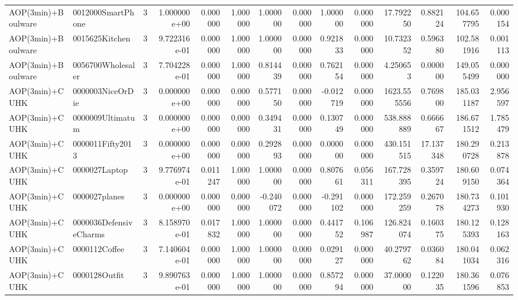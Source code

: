 \begin{tabular}{llrr|r|rr|rr|rr|rrr}
       AOP(3min)+Boulware &      0012000SmartPhone &       3 & 1.000000e+00 & 0.000000 & 1.000000 &      1.000000 & 0.000000 &      1.000000 & 0.000000 &     17.792250 &    0.882124 &   104.657795 &    0.000154 \\
       AOP(3min)+Boulware &         0015625Kitchen &       3 & 9.722316e-01 & 0.000000 & 1.000000 &      1.000000 & 0.000000 &      0.921833 & 0.000000 &     10.732352 &    0.596380 &   102.581916 &    0.001113 \\
       AOP(3min)+Boulware &      0056700Wholesaler &       3 & 7.704228e-01 & 0.000000 & 1.000000 &      0.814439 & 0.000000 &      0.762154 & 0.000000 &      4.250653 &    0.000000 &   149.055499 &    0.000000 \\
           AOP(3min)+CUHK &       0000003NiceOrDie &       3 & 0.000000e+00 & 0.000000 & 0.000000 &      0.577150 & 0.000000 &     -0.012719 & 0.000000 &   1623.555556 &    0.769800 &   185.031187 &    2.956597 \\
           AOP(3min)+CUHK &       0000009Ultimatum &       3 & 0.000000e+00 & 0.000000 & 0.000000 &      0.349431 & 0.000000 &      0.130749 & 0.000000 &    538.888889 &    0.666667 &   186.671512 &    1.785479 \\
           AOP(3min)+CUHK &       0000011Fifty2013 &       3 & 0.000000e+00 & 0.000000 & 0.000000 &      0.292893 & 0.000000 &      0.000000 & 0.000000 &    430.151515 &   17.137348 &   180.290728 &    0.213878 \\
           AOP(3min)+CUHK &          0000027Laptop &       3 & 9.776974e-01 & 0.011247 & 1.000000 &      1.000000 & 0.000000 &      0.807661 & 0.056311 &    167.728395 &    0.359724 &   180.609150 &    0.074364 \\
           AOP(3min)+CUHK &          0000027planes &       3 & 0.000000e+00 & 0.000000 & 0.000000 &     -0.240072 & 0.000000 &     -0.291102 & 0.000000 &    172.259259 &    0.267078 &   180.734273 &    0.101930 \\
           AOP(3min)+CUHK & 0000036DefensiveCharms &       3 & 8.158970e-01 & 0.017832 & 1.000000 &      1.000000 & 0.000000 &      0.441752 & 0.106987 &    126.824074 &    0.160375 &   180.125393 &    0.128163 \\
           AOP(3min)+CUHK &          0000112Coffee &       3 & 7.140604e-01 & 0.000000 & 1.000000 &      1.000000 & 0.000000 &      0.029127 & 0.000000 &     40.279762 &    0.036084 &   180.041034 &    0.062316 \\
           AOP(3min)+CUHK &          0000128Outfit &       3 & 9.890763e-01 & 0.000000 & 1.000000 &      1.000000 & 0.000000 &      0.857294 & 0.000000 &     37.000000 &    0.122035 &   180.361596 &    0.076853 \\

\end{tabular}
